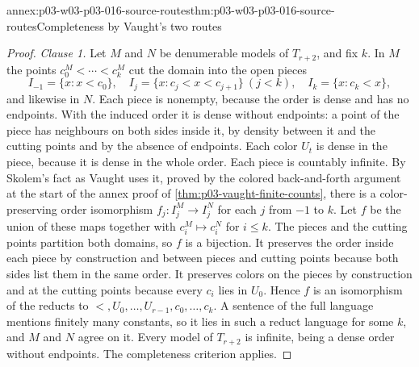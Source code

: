 \begin{annexitem}{annex:p03-w03-p03-016-source-routes}{thm:p03-w03-p03-016-source-routes}{Completeness by Vaught's two routes}
\begin{proof}
\emph{Clause 1.} Let \(M\) and \(N\) be denumerable models of
\(T_{r+2}\), and fix \(k\). In \(M\) the points
\(c_0^M<\cdots<c_k^M\) cut the domain into the open pieces
\[
 I_{-1}=\{x:x<c_0\},\quad I_j=\{x:c_j<x<c_{j+1}\}\ (j<k),\quad
 I_k=\{x:c_k<x\},
\]
and likewise in \(N\). Each piece is nonempty, because the order is dense
and has no endpoints. With the induced order it is dense without endpoints:
a point of the piece has neighbours on both sides inside it, by density
between it and the cutting points and by the absence of endpoints. Each
color \(U_t\) is dense in the piece, because it is dense in the whole
order. Each piece is countably infinite. By Skolem's fact as Vaught uses it,
proved by the colored back-and-forth argument at the start of the annex
proof of \cref{thm:p03-vaught-finite-counts}, there is a color-preserving
order isomorphism \(f_j:I_j^M\to I_j^N\) for each \(j\) from \(-1\) to
\(k\). Let \(f\) be the union of these maps together with
\(c_i^M\mapsto c_i^N\) for \(i\le k\). The pieces and the cutting points
partition both domains, so \(f\) is a bijection. It preserves the order
inside each piece by construction and between pieces and cutting points
because both sides list them in the same order. It preserves colors on the
pieces by construction and at the cutting points because every \(c_i\) lies
in \(U_0\). Hence \(f\) is an isomorphism of the reducts to
\(<,U_0,\ldots,U_{r-1},c_0,\ldots,c_k\). A sentence of the full language
mentions finitely many constants, so it lies in such a reduct language for
some \(k\), and \(M\) and \(N\) agree on it. Every model of \(T_{r+2}\) is
infinite, being a dense order without endpoints. The completeness criterion
applies.


\end{proof}
\end{annexitem}

